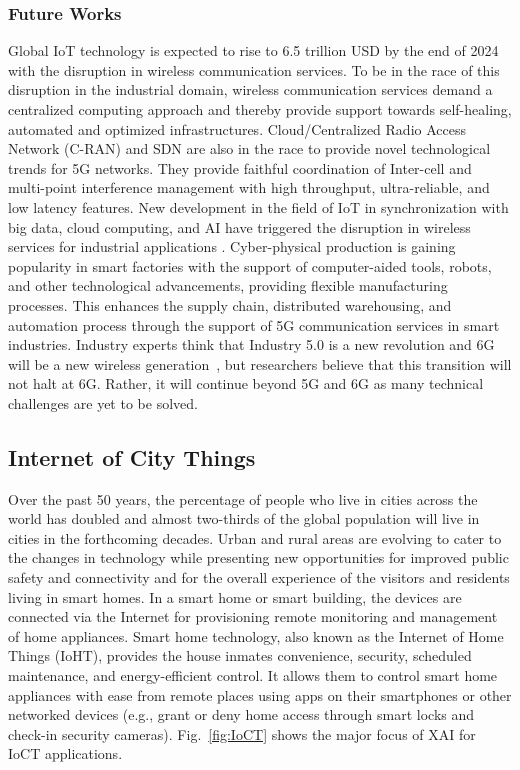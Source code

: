 \documentclass[journal]{IEEEtran}
\begin{document}
\subsubsection{Future Works}
Global IoT technology is expected to rise to 6.5 trillion USD by the end of 2024 with the disruption in wireless communication services. To be in the race of this disruption in the industrial domain, wireless communication services demand a centralized computing approach and thereby provide support towards self-healing, automated and optimized infrastructures. Cloud/Centralized Radio Access Network (C-RAN) and SDN are also in the race to provide novel technological trends for 5G networks. They provide faithful coordination of Inter-cell and multi-point interference management with high throughput, ultra-reliable, and low latency features\cite{zanferrari_morais_when_2020}. New development in the field of IoT in synchronization with big data, cloud computing, and AI have triggered the disruption in wireless services for industrial applications \cite{zhang_2020_2020}. Cyber-physical production is gaining popularity in smart factories with the support of computer-aided tools, robots, and other technological advancements, providing flexible manufacturing processes. This enhances the supply chain, distributed warehousing, and automation process through the support of 5G communication services in smart industries\cite{vernadat_information_2018}. Industry experts think that Industry 5.0 is a new revolution and 6G will be a new wireless generation~\cite{maddikunta2021industry}, but researchers believe that this transition will not halt at 6G. Rather, it will continue beyond 5G and 6G as many technical challenges are yet to be solved.

\subsection{Internet of City Things}

Over the past 50 years, the percentage of people who live in cities across the world has doubled and almost two-thirds of the global population will live in cities in the forthcoming decades. Urban and rural areas are evolving to cater to the changes in technology while presenting new opportunities for improved public safety and connectivity and for the overall experience of the visitors and residents living in smart homes. In a smart home or smart building, the devices are connected via the Internet for provisioning remote monitoring and management of home appliances. Smart home technology, also known as the Internet of Home Things (IoHT), provides the house inmates convenience, security, scheduled maintenance, and energy-efficient control. It allows them to control smart home appliances with ease from remote places using apps on their smartphones or other networked devices (e.g., grant or deny home access through smart locks and check-in security cameras). Fig.~\ref{fig:IoCT} shows the major focus of XAI for IoCT applications.
\end{document}
